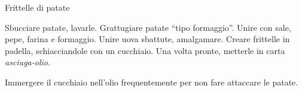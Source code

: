 \begin{recipe}{Frittelle di patate}
    \begin{header}

    \end{header}
    
    \begin{ingredients}[4]
    \end{ingredients}
    
    \begin{preparation}
        \step Sbucciare patate, lavarle.
        \step Grattugiare patate ``tipo formaggio''.
        \step Unire con sale, pepe, farina e formaggio.
        \step Unire uova sbattute, amalgamare.
        \step Creare frittelle in padella, schiacciandole con un cucchiaio.
        \step Una volta pronte, metterle in carta \textit{asciuga-olio}.
    \end{preparation}
    
    \begin{suggestion}
        \suggestionMark Immergere il cucchiaio nell'olio frequentemente per non fare attaccare le patate.
    \end{suggestion}
    
\end{recipe}

